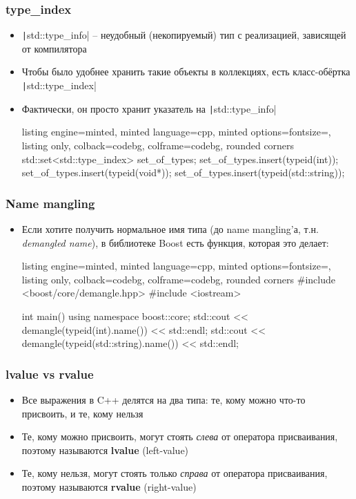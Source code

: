 \documentclass[10pt]{beamer}
\begin{document}
\begin{frame}[fragile]
\frametitle{type\_index}
\begin{itemize}
\item \texttt|std::type_info| -- неудобный (некопируемый) тип с реализацией, зависящей от компилятора
\pause
\item Чтобы было удобнее хранить такие объекты в коллекциях, есть класс-обёртка \texttt|std::type_index|
\pause
\item Фактически, он просто хранит указатель на \texttt|std::type_info|
\pause
{}
\begin{tcblisting}{listing engine=minted, minted language=cpp, minted options={fontsize=\scriptsize}, listing only, colback=codebg, colframe=codebg, rounded corners}
std::set<std::type_index> set_of_types;
set_of_types.insert(typeid(int));
set_of_types.insert(typeid(void*));
set_of_types.insert(typeid(std::string));
\end{tcblisting}
\end{itemize}
\end{frame}

\begin{frame}[fragile]
\frametitle{Name mangling}
\begin{itemize}
\item Если хотите получить нормальное имя типа (до name mangling'а, т.н. \textit{demangled name}), в библиотеке Boost есть функция, которая это делает:
\pause
{}
\begin{tcblisting}{listing engine=minted, minted language=cpp, minted options={fontsize=\scriptsize}, listing only, colback=codebg, colframe=codebg, rounded corners}
#include <boost/core/demangle.hpp>
#include <iostream>

int main() {
  using namespace boost::core;
  std::cout << demangle(typeid(int).name()) << std::endl;
  std::cout << demangle(typeid(std::string).name()) << std::endl;
}
\end{tcblisting}
\end{itemize}
\end{frame}

\begin{frame}[fragile]
\frametitle{lvalue vs rvalue}
\begin{itemize}
\item Все выражения в C++ делятся на два типа: те, кому можно что-то присвоить, и те, кому нельзя
\pause
\item Те, кому можно присвоить, могут стоять \textit{слева} от оператора присваивания, поэтому называются \textbf{lvalue} (left-value)
\pause
\item Те, кому нельзя, могут стоять только \textit{справа} от оператора присваивания, поэтому называются \textbf{rvalue} (right-value)
\end{itemize}
\end{frame}
\end{document}
